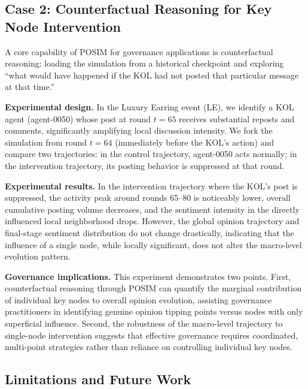 \documentclass[a4paper,fleqn]{cas-dc}
\begin{document}
\subsection{Case 2: Counterfactual Reasoning for Key Node Intervention}\label{subsec:case2}

A core capability of POSIM for governance applications is counterfactual reasoning: loading the simulation from a historical checkpoint and exploring ``what would have happened if the KOL had not posted that particular message at that time.''

\textbf{Experimental design.} In the Luxury Earring event (LE), we identify a KOL agent (agent-0050) whose post at round $t=65$ receives substantial reposts and comments, significantly amplifying local discussion intensity. We fork the simulation from round $t=64$ (immediately before the KOL's action) and compare two trajectories: in the control trajectory, agent-0050 acts normally; in the intervention trajectory, its posting behavior is suppressed at that round.

\textbf{Experimental results.} In the intervention trajectory where the KOL's post is suppressed, the activity peak around rounds 65--80 is noticeably lower, overall cumulative posting volume decreases, and the sentiment intensity in the directly influenced local neighborhood drops. However, the global opinion trajectory and final-stage sentiment distribution do not change drastically, indicating that the influence of a single node, while locally significant, does not alter the macro-level evolution pattern.

\textbf{Governance implications.} This experiment demonstrates two points. First, counterfactual reasoning through POSIM can quantify the marginal contribution of individual key nodes to overall opinion evolution, assisting governance practitioners in identifying genuine opinion tipping points versus nodes with only superficial influence. Second, the robustness of the macro-level trajectory to single-node intervention suggests that effective governance requires coordinated, multi-point strategies rather than reliance on controlling individual key nodes.

\subsection{Limitations and Future Work}
\end{document}
